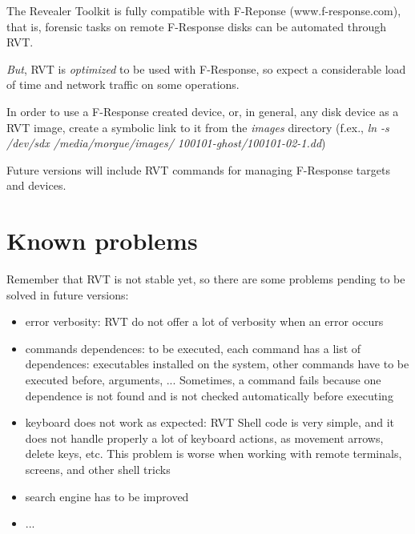 \documentclass[a4paper,11pt,oneside]{report}
\begin{document}
The Revealer Toolkit is fully compatible with F-Reponse (www.f-response.com), that is, forensic tasks on remote F-Response disks can be automated through RVT. 

\emph{But}, RVT is \emph{optimized} to be used with F-Response, so expect a considerable load of time and network traffic on some operations.

In order to use a F-Response created device, or, in general, any disk device as a RVT image, create a symbolic link to it from the \emph{images} directory (f.ex., \emph{ln -s /dev/sdx /media/morgue/images/ 100101-ghost/100101-02-1.dd})

Future versions will include RVT commands for managing F-Response targets and devices.




\section{Known problems}

Remember that RVT is not stable yet, so there are some problems pending to be solved in future versions:


\begin{itemize}

\item error verbosity:  RVT do not offer a lot of verbosity when an error occurs

\item commands dependences:  to be executed, each command has a list of dependences: executables installed on the system, other commands have to be executed before, arguments, ...  Sometimes, a command fails because one dependence is not found and is not checked automatically before executing

\item keyboard does not work as expected:  RVT Shell code is very simple, and it does not handle properly a lot of keyboard actions, as movement arrows, delete keys, etc. This problem is worse when working with remote terminals, screens, and other shell tricks

\item search engine has to be improved

\item ... 

\end{itemize}




\appendix
\end{document}
